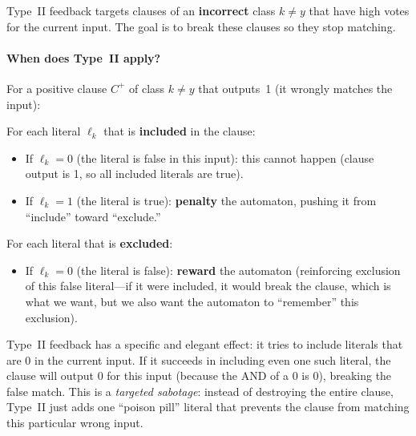 Type~II feedback targets clauses of an \textbf{incorrect} class
$k \neq y$ that have high votes for the current input. The goal is to
break these clauses so they stop matching.

\paragraph{When does Type~II apply?}
For a positive clause $C^+$ of class $k \neq y$ that outputs~1 (it
wrongly matches the input):

For each literal $\ell_k$ that is \textbf{included} in the clause:
\begin{itemize}
  \item If $\ell_k = 0$ (the literal is false in this input): this
    cannot happen (clause output is 1, so all included literals are
    true).
  \item If $\ell_k = 1$ (the literal is true): \textbf{penalty} the
    automaton, pushing it from ``include'' toward ``exclude.''
\end{itemize}

For each literal that is \textbf{excluded}:
\begin{itemize}
  \item If $\ell_k = 0$ (the literal is false): \textbf{reward} the
    automaton (reinforcing exclusion of this false literal---if it
    were included, it would break the clause, which is what we want,
    but we also want the automaton to ``remember'' this exclusion).
\end{itemize}

\begin{keyinsight}
Type~II feedback has a specific and elegant effect: it tries to
include literals that are 0 in the current input. If it succeeds in
including even one such literal, the clause will output 0 for this
input (because the AND of a 0 is 0), breaking the false match. This
is a \emph{targeted sabotage}: instead of destroying the entire
clause, Type~II just adds one ``poison pill'' literal that prevents
the clause from matching this particular wrong input.
\end{keyinsight}

